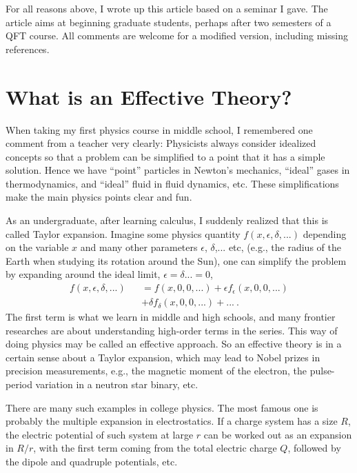\documentclass[prd,aps,twocolumn,preprintnumbers,showpacs,nofootinbib,superscriptaddress,notitlepage]{revtex4-1}
\begin{document}
For all reasons above, I wrote up this article based on a seminar I gave.
The article aims at beginning graduate students, perhaps after two semesters
of a QFT course. All comments are welcome for a modified version,
including missing references.

\section{What is an Effective Theory?}

When taking my first physics course in middle school, I remembered
one comment from a teacher very clearly: Physicists always consider idealized
concepts so that a problem can be simplified to a point that it has a simple solution.
Hence we have ``point'' particles in Newton's mechanics, ``ideal'' gases in thermodynamics,
and ``ideal'' fluid in fluid dynamics, etc. These simplifications
make the main physics points clear and fun.

As an undergraduate, after learning calculus, I suddenly realized that
this is called Taylor expansion. Imagine some physics quantity
$f(x,\epsilon,\delta,...)$ depending on the variable $x$ and many
other parameters $\epsilon$, $\delta$,... etc, (e.g.,
the radius of the Earth when studying its rotation around the Sun),
one can simplify the problem by expanding around the ideal limit, $\epsilon=\delta...=0$,
\begin{eqnarray}
    f(x,\epsilon,\delta,...) &&= f(x, 0,0,...)+ \epsilon f_\epsilon(x,0,0,...)\nonumber\\
        && +\delta f_\delta (x,0,0,...)+... \ .
\end{eqnarray}
The first term is what we learn in middle and high schools, and many
frontier researches are about understanding high-order
terms in the series. This way of doing physics may be called an effective
approach. So an effective theory is in a certain sense about
a Taylor expansion, which may lead to Nobel prizes
in precision measurements, e.g., the magnetic moment of the electron,
the pulse-period variation in a neutron star binary, etc.

There are many such examples in college physics. The most famous one
is probably the multiple expansion in electrostatics. If a charge
system has a size $R$, the electric potential of such system at large $r$
can be worked out as an expansion in $R/r$, with the first term
coming from the total electric charge $Q$, followed by the dipole and
quadruple potentials, etc.
\end{document}
